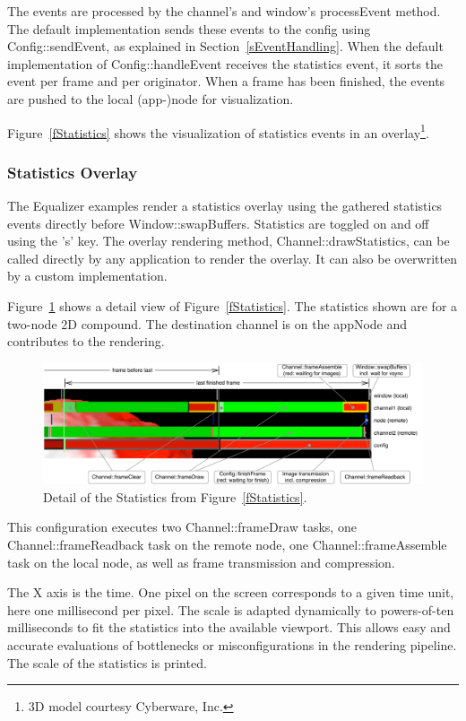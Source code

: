 \documentclass[10pt,a4]{scrartcl}
\newcommand{\fig}[1]{Figure~\ref{#1}}
\newcommand{\sref}[1]{Section~\ref{#1}}
\begin{document}
The events are processed by the channel's and window's
\textsf{processEvent} method. The default implementation sends these
events to the config using \textsf{Config::sendEvent}, as explained in
\sref{sEventHandling}. When the default implementation of
\textsf{Config::handleEvent} receives the statistics event, it sorts the
event per frame and per originator. When a frame has been finished, the
events are pushed to the local (app-)node for visualization.

\fig{fStatistics} shows the visualization of statistics events in an
overlay\footnote{3D model courtesy Cyberware, Inc.}.

\subsubsection{Statistics Overlay}

The Equalizer examples render a statistics overlay using the gathered
statistics events directly before
\textsf{Window::swapBuffers}. Statistics are toggled on and off using
the 's' key. The overlay rendering method,
\textsf{Channel::drawStatistics}, can be called directly by any
application to render the overlay. It can also be overwritten by a
custom implementation.

\fig{fStatisticsDetail} shows a detail view of \fig{fStatistics}. The
statistics shown are for a two-node 2D compound. The destination channel
is on the \textsf{appNode} and contributes to the rendering.

\begin{figure}[h!t]
  \includegraphics[width=\textwidth]{images/statisticsDetail}
  {\caption{\label{fStatisticsDetail}Detail of the Statistics from
      \fig{fStatistics}.}}
\end{figure}

This configuration executes two \textsf{Channel::frameDraw} tasks, one
\textsf{Channel::frame\-Read\-back} task on the remote node, one
\textsf{Channel::frameAssemble} task on the local node, as well as frame
transmission and compression.

The X axis is the time. One pixel on the screen corresponds to a given
time unit, here one millisecond per pixel. The scale is adapted dynamically
to powers-of-ten milliseconds to fit the statistics into the available
viewport. This allows easy and accurate evaluations of bottlenecks or
misconfigurations in the rendering pipeline. The scale of the statistics
is printed.
\end{document}
